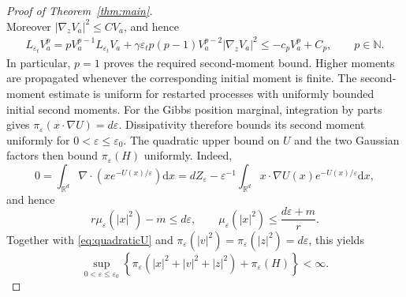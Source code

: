 \documentclass[10pt,a4paper]{amsart}
\newcommand{\R}{\mathbb R}
\newcommand{\dd}{\mathrm d}
\newcommand{\eps}{\varepsilon}
\theoremstyle{plain}
\theoremstyle{definition}
\begin{document}
\begin{proof}[Proof of Theorem~\ref{thm:main}]
\begin{equation}
\end{equation}
Moreover $|\nabla_z V_a|^2\leq C V_a$, and hence
\begin{align*}
 L_{\eps_t}V_a^p
 =pV_a^{p-1}L_{\eps_t}V_a
   +\gamma\eps_t p(p-1)V_a^{p-2}|\nabla_zV_a|^2\leq-c_pV_a^p+C_p,
 \qquad p\in\mathbb N.
\end{align*}
In particular, $p=1$ proves the required second-moment bound. Higher moments
are propagated whenever the corresponding initial moment is finite. The
second-moment estimate is uniform for restarted processes with uniformly
bounded initial second moments.
For the Gibbs position marginal, integration by parts gives
$\pi_\eps(x\cdot\nabla U)=d\eps$. Dissipativity therefore bounds its
second moment uniformly for $0<\eps\leq\eps_0$. The quadratic upper bound
on $U$ and the two Gaussian factors then bound $\pi_\eps(H)$ uniformly.
Indeed,
\[
 0=\int_{\R^d}\nabla\cdot\left(xe^{-U(x)/\eps}\right)\dd x
 =dZ_\eps-\eps^{-1}\int_{\R^d}
 x\cdot\nabla U(x)e^{-U(x)/\eps}\dd x,
\]
and hence
\[
 r\mu_\eps(|x|^2)-m\leq d\eps,
 \qquad
 \mu_\eps(|x|^2)\leq\frac{d\eps+m}{r}.
\]
Together with \eqref{eq:quadraticU} and
$\pi_\eps(|v|^2)=\pi_\eps(|z|^2)=d\eps$, this yields
\begin{equation}\label{eq:gibbsmoments}
 \sup_{0<\eps\leq\eps_0}
 \left\{\pi_\eps\left(|x|^2+|v|^2+|z|^2\right)+\pi_\eps(H)\right\}<\infty.
\end{equation}


\end{proof}
\end{document}
